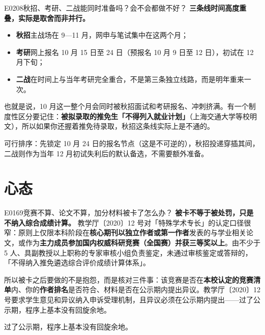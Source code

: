 \begin{qa}{E0208}{秋招、考研、二战能同时准备吗？会不会都做不好？}
\textbf{三条线时间高度重叠，实际是取舍而非并行。}
\begin{itemize}
  \item \textbf{秋招}主战场在 9—11 月，网申与笔试集中在这两个月；
  \item \textbf{考研}网上报名 10 月 15 日至 24 日（预报名 10 月 9 日至 12 日），初试在 12 月下旬；
  \item \textbf{二战}在时间上与当年考研完全重合，不是第三条独立线路，而是明年重来一次。
\end{itemize}

也就是说，10 月这一整个月会同时被秋招面试和考研报名、冲刺挤满。有一个制度性区分要记住：\textbf{被拟录取的推免生「不得列入就业计划」}（上海交通大学等校明文），所以如果你还握着推免待录取，秋招这条线实际上是不通的。

可行排序：先锁定 10 月 24 日的报名节点（这是不可逆的），秋招投递穿插其间，二战则作为当年 12 月初试失利后的默认备选，不需要额外准备。
\end{qa}

\section{心态}
\begin{qa}{E0169}{竞赛不算、论文不算，加分材料被卡了怎么办？}
\textbf{被卡不等于被处罚，只是不纳入综合成绩计算。}
教学厅〔2020〕12 号对「特殊学术专长」的认定口径很窄：原则上仅限本科阶段在\textbf{核心期刊以独立作者或第一作者}发表的与学业相关论文，或作为\textbf{主力成员参加国内权威科研竞赛（全国赛）并获三等奖以上}。由不少于 5 人、具副教授以上职称的专家审核小组负责鉴定，未通过审核鉴定或答辩的，「不得纳入推免遴选综合评价成绩计算体系」。

所以被卡之后要做的不是抱怨，而是核对三件事：该竞赛是否在\textbf{本校认定的竞赛清单}内、你的\textbf{作者排名}是否符合、材料是否在公示期内提出异议。教学厅〔2020〕12 号要求学生意见和异议纳入申诉受理机制，且异议必须在公示期内提出——过了公示期，程序上基本没有回旋余地。

过了公示期，程序上基本没有回旋余地。
\end{qa}

